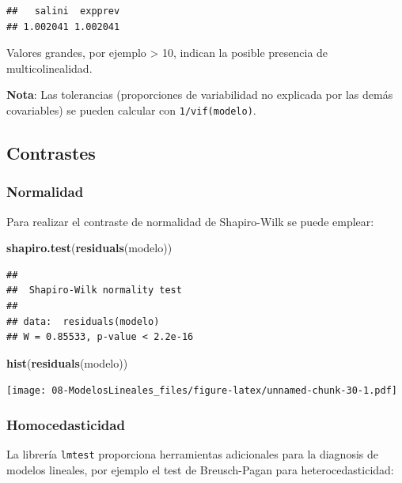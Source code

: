 \documentclass[]{book}
\newenvironment{Shaded}{\begin{snugshade}}{\end{snugshade}}
\newcommand{\KeywordTok}[1]{\textcolor[rgb]{0.13,0.29,0.53}{\textbf{#1}}}
\newcommand{\NormalTok}[1]{#1}
\begin{document}
\begin{verbatim}
##   salini  expprev 
## 1.002041 1.002041
\end{verbatim}

Valores grandes, por ejemplo \textgreater{} 10, indican la posible
presencia de multicolinealidad.

\textbf{Nota}: Las tolerancias (proporciones de variabilidad no
explicada por las demás covariables) se pueden calcular con
\texttt{1/vif(modelo)}.

\subsection{Contrastes}\label{contrastes}

\subsubsection{Normalidad}\label{normalidad}

Para realizar el contraste de normalidad de Shapiro-Wilk se puede
emplear:

\begin{Shaded}
\begin{Highlighting}[]
\KeywordTok{shapiro.test}\NormalTok{(}\KeywordTok{residuals}\NormalTok{(modelo))}
\end{Highlighting}
\end{Shaded}

\begin{verbatim}
## 
##  Shapiro-Wilk normality test
## 
## data:  residuals(modelo)
## W = 0.85533, p-value < 2.2e-16
\end{verbatim}

\begin{Shaded}
\begin{Highlighting}[]
\KeywordTok{hist}\NormalTok{(}\KeywordTok{residuals}\NormalTok{(modelo))}
\end{Highlighting}
\end{Shaded}

\texttt{[image: 08-ModelosLineales\_files/figure-latex/unnamed-chunk-30-1.pdf]}

\subsubsection{Homocedasticidad}\label{homocedasticidad}

La librería \texttt{lmtest} proporciona herramientas adicionales para la
diagnosis de modelos lineales, por ejemplo el test de Breusch-Pagan para
heterocedasticidad:
\end{document}

